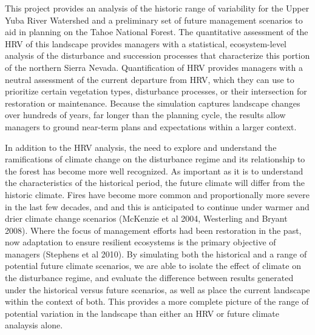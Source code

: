 This project provides an analysis of the historic range of variability for the Upper Yuba River Watershed and a preliminary set of future management scenarios to aid in planning on the Tahoe National Forest. The quantitative assessment of the HRV of this landscape provides managers with a statistical, ecosystem-level analysis of the disturbance and succession processes that characterize this portion of the northern Sierra Nevada. Quantification of HRV provides managers with a neutral assessment of the current departure from HRV, which they can use to prioritize certain vegetation types, disturbance processes, or their intersection for restoration or maintenance. Because the simulation captures landscape changes over hundreds of years, far longer than the planning cycle, the results allow managers to ground near-term plans and expectations within a larger context. 

In addition to the HRV analysis, the need to explore and understand the ramifications of climate change on the disturbance regime and its relationship to the forest has become more well recognized. As important as it is to understand the characteristics of the historical period, the future climate will differ from the historic climate. Fires have become more common and proportionally more severe in the last few decades, and and this is anticipated to continue under warmer and drier climate change scenarios (McKenzie et al 2004, Westerling and Bryant 2008). Where the focus of management efforts had been restoration in the past, now adaptation to ensure resilient ecosystems is the primary objective of managers (Stephens et al 2010). By simulating both the historical and a range of potential future climate scenarios, we are able to isolate the effect of climate on the disturbance regime, and evaluate the difference between results generated under the historical versus future scenarios, as well as place the current landscape within the context of both. This provides a more complete picture of the range of potential variation in the landscape than either an HRV or future climate analaysis alone.


